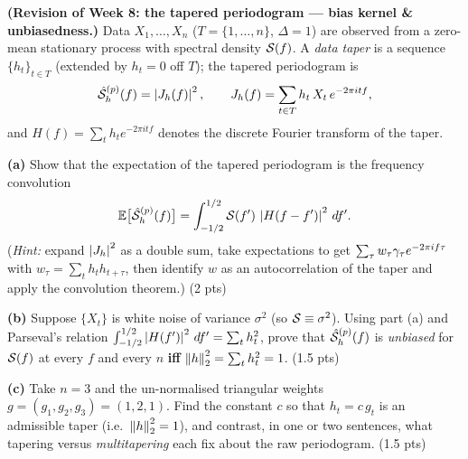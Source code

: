 \documentclass[11pt]{article}
\begin{document}
\textbf{(Revision of Week 8: the tapered periodogram --- bias kernel \& unbiasedness.)} Data $X_1,\dots,X_n$ ($T=\{1,\dots,n\}$, $\Delta=1$) are observed from a zero-mean stationary process with spectral density $\mathcal{S}(f)$. A \emph{data taper} is a sequence $\{h_t\}_{t\in T}$ (extended by $h_t=0$ off $T$); the tapered periodogram is
\[
\hat{\mathcal{S}}^{(p)}_h(f)=\left\lvert J_h(f) \right\rvert^2 ,\qquad
J_h(f)=\sum_{t\in T}h_t\,X_t\,e^{-2\pi itf},
\]
and $H(f)=\sum_{t}h_t e^{-2\pi itf}$ denotes the discrete Fourier transform of the taper.

\textbf{(a)} Show that the expectation of the tapered periodogram is the frequency convolution
\[
\mathbb{E}\bigl[\hat{\mathcal{S}}^{(p)}_h(f)\bigr]=\int_{-1/2}^{1/2}\mathcal{S}(f')\,\left\lvert H(f-f') \right\rvert^2\,df' .
\]
(\emph{Hint:} expand $\left\lvert J_h \right\rvert^2$ as a double sum, take expectations to get $\sum_\tau w_\tau\gamma_\tau e^{-2\pi if\tau}$ with $w_\tau=\sum_t h_t h_{t+\tau}$, then identify $w$ as an autocorrelation of the taper and apply the convolution theorem.) \hfill(2 pts)

\textbf{(b)} Suppose $\{X_t\}$ is white noise of variance $\sigma^2$ (so $\mathcal{S}\equiv\sigma^2$). Using part (a) and Parseval's relation $\int_{-1/2}^{1/2}\left\lvert H(f') \right\rvert^2\,df'=\sum_t h_t^2$, prove that $\hat{\mathcal{S}}^{(p)}_h(f)$ is \emph{unbiased} for $\mathcal{S}(f)$ at every $f$ and every $n$ \textbf{iff} $\left\lVert h \right\rVert_2^2=\sum_t h_t^2=1$. \hfill(1.5 pts)

\textbf{(c)} Take $n=3$ and the un-normalised triangular weights $g=(g_1,g_2,g_3)=(1,2,1)$. Find the constant $c$ so that $h_t=c\,g_t$ is an admissible taper (i.e.\ $\left\lVert h \right\rVert_2^2=1$), and contrast, in one or two sentences, what tapering versus \emph{multitapering} each fix about the raw periodogram. \hfill(1.5 pts)
\answerpage
\end{document}
